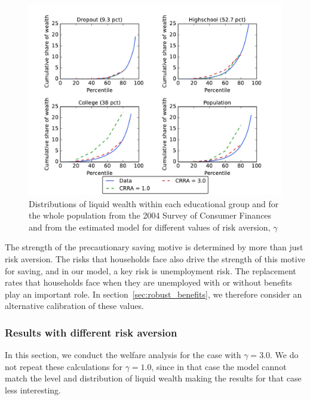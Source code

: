 \documentclass[\econtexRoot/HAFiscal]{subfiles}
\begin{document}
\begin{figure}[th]
  \begin{center}
    \includegraphics[width=.9\textwidth]{../Figures/LorenzPoints_robustness_CRRA}
    \caption{Distributions of liquid wealth within each educational group and for the whole population from the 2004 Survey of Consumer Finances and from the estimated model for different values of risk aversion, $\gamma$}
    \notinsubfile{\label{fig:LorenzPts_robustness_CRRA}}
  \end{center}
\end{figure}

The strength of the precautionary saving motive is determined by more than just risk aversion.
The risks that households face also drive the strength of this motive for saving, and in our model, a key risk is unemployment risk.
The replacement rates that households face when they are unemployed with or without benefits play an important role.
In section~\ref{sec:robust_benefits}, we therefore consider an alternative calibration of these values.


\subsubsection{Results with different risk aversion}
\notinsubfile{\label{sec:robust_gamma_results}}

In this section, we conduct the welfare analysis for the case with $\gamma=3.0$.
We do not repeat these calculations for $\gamma=1.0$, since in that case the model cannot match the level and distribution of liquid wealth making the results for that case less interesting.
\end{document}
